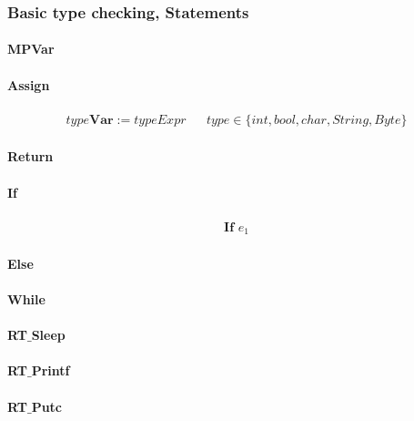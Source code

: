 \documentclass[paper=a4, fontsize=11pt]{article}
\numberwithin{equation}{section}	%
\numberwithin{figure}{section}		%
\numberwithin{table}{section}		%
\begin{document}
        \subsubsection {Basic type checking, Statements}
            \paragraph*{MPVar}
            \paragraph*{Assign}
            \begin{align*}
                	type \textbf{Var} := typeExpr && type \in \{int,bool,char,String,Byte\}
            \end{align*}
            \paragraph*{Return}
            \paragraph*{If}
            \begin{align*}
                	\textbf{If } e_1 
            \end{align*}
            \paragraph*{Else}
            \paragraph*{While}
            \paragraph*{RT$\_$Sleep}
            \paragraph*{RT$\_$Printf}
            \paragraph*{RT$\_$Putc}
\end{document}
